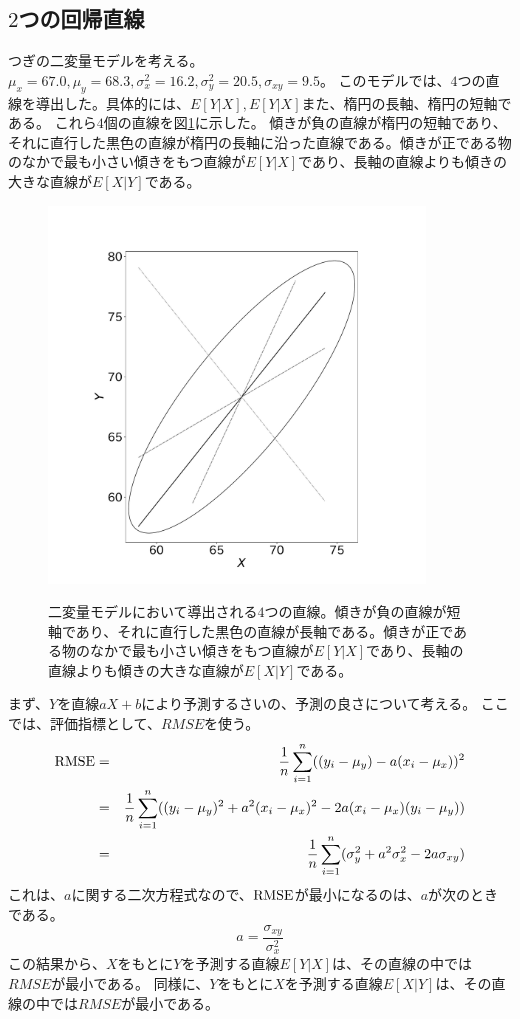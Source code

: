 \subsection{$2$つの回帰直線}
つぎの二変量モデルを考える。
$\mu_x=67.0, \mu_y = 68.3,\sigma^2_x=16.2,\sigma^2_y=20.5,\sigma_{xy}=9.5$。
このモデルでは、$4$つの直線を導出した。具体的には、$E[Y|X],E[Y|X]$また、楕円の長軸、楕円の短軸である。
これら$4$個の直線を図\ref{fig:multivariate_normal_four_line}に示した。
傾きが負の直線が楕円の短軸であり、それに直行した黒色の直線が楕円の長軸に沿った直線である。傾きが正である物のなかで最も小さい傾きをもつ直線が$E[Y|X]$であり、長軸の直線よりも傾きの大きな直線が$E[X|Y]$である。
\begin{figure}
 \begin{center}
  \includegraphics[width=10cm]{./image/16_/multivariate_normal_four_line.pdf}
  \label{fig:multivariate_normal_four_line}
  \caption{二変量モデルにおいて導出される$4$つの直線。傾きが負の直線が短軸であり、それに直行した黒色の直線が長軸である。傾きが正である物のなかで最も小さい傾きをもつ直線が$E[Y|X]$であり、長軸の直線よりも傾きの大きな直線が$E[X|Y]$である。}
 \end{center}
\end{figure}



まず、$Y$を直線$aX+b$により予測するさいの、予測の良さについて考える。
ここでは、評価指標として、$RMSE$を使う。
\begin{eqnarray*}
 \rm{RMSE} &=& \frac{1}{n}\sum_{i=1}^n((y_i-\mu_y)-a(x_i-\mu_x))^2\\
 &=& \frac{1}{n}\sum_{i=1}^n((y_i-\mu_y)^2+a^2(x_i-\mu_x)^2-2a(x_i-\mu_x)(y_i-\mu_y))\\
&=& \frac{1}{n}\sum_{i=1}^n (\sigma_y^2+a^2\sigma_x^2-2a\sigma_{xy})\\
\end{eqnarray*}
これは、$a$に関する二次方程式なので、$\rm{RMSE}$が最小になるのは、$a$が次のときである。
\begin{equation*}
 a = \frac{\sigma_{xy}}{\sigma_x^2}
\end{equation*}
この結果から、$X$をもとに$Y$を予測する直線$E[Y|X]$は、その直線の中では$RMSE$が最小である。
同様に、$Y$をもとに$X$を予測する直線$E[X|Y]$は、その直線の中では$RMSE$が最小である。

